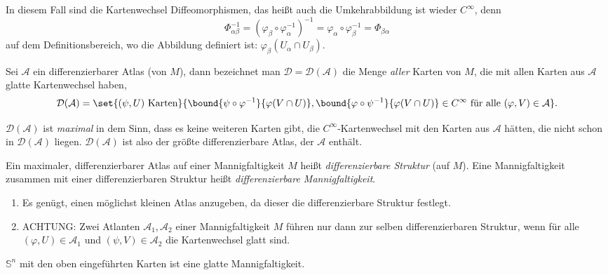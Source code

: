 \begin{rem*}
	In diesem Fall sind die Kartenwechsel Diffeomorphismen, das heißt auch die Umkehrabbildung ist wieder $C^\infty$, denn
	\[ \Phi_{\alpha\beta}^{-1} = \left(\varphi_\beta \circ \varphi_\alpha^{-1}\right)^{-1} = \varphi_\alpha \circ \varphi_\beta^{-1} = \Phi_{\beta\alpha} \]
	auf dem Definitionsbereich, wo die Abbildung definiert ist: $ \varphi_\beta(U_\alpha \cap U_\beta). $
\end{rem*}

\begin{defn}
	Sei $\mathcal{A}$ ein differenzierbarer Atlas (von $M$), dann bezeichnet man $\mathcal{D} = \mathcal{D}(\mathcal{A})$ die Menge \emph{aller} Karten von $M$, die mit allen Karten aus $\mathcal{A}$ glatte Kartenwechsel haben,
	\[ \mathcal{D}(\mathcal{A}) = \set{(\psi,U) \ \text{Karten}}{\bound{\psi \circ \varphi^{-1}}{\varphi(V \cap U)}, \bound{\varphi \circ \psi^{-1}}{\varphi(V \cap U)} \in C^\infty \ \text{für alle } (\varphi,V) \in \mathcal{A}}. \]
	\begin{rem*}
		$\mathcal{D}(\mathcal{A})$ ist \emph{maximal} in dem Sinn, dass es keine weiteren Karten gibt, die $C^\infty$-Kartenwechsel mit den Karten aus $\mathcal{A}$ hätten, die nicht schon in $\mathcal{D}(\mathcal{A})$ liegen. $\mathcal{D}(\mathcal{A})$ ist also der größte differenzierbare Atlas, der $\mathcal{A}$ enthält.
	\end{rem*}
	\begin{notat*}
		Ein maximaler, differenzierbarer Atlas auf einer Mannigfaltigkeit $M$ heißt \emph{differenzierbare Struktur} (auf $M$). Eine Mannigfaltigkeit zusammen mit einer differenzierbaren Struktur heißt \emph{differenzierbare Mannigfaltigkeit}.
	\end{notat*}
\end{defn}

\begin{rem*}
	\begin{enumerate}[label = {\roman*})]
		\item Es genügt, einen möglichst kleinen Atlas anzugeben, da dieser die differenzierbare Struktur festlegt.
		\item ACHTUNG: Zwei Atlanten $ \mathcal{A}_1,\mathcal{A}_2 $ einer Mannigfaltigkeit $M$ führen nur dann zur selben differenzierbaren Struktur, wenn für alle $ (\varphi,U) \in \mathcal{A}_1 $ und $ (\psi,V) \in \mathcal{A}_2 $ die Kartenwechsel glatt sind.
	\end{enumerate}
\end{rem*}

\begin{exmp*}
	$ \mathbb{S}^n $ mit den oben eingeführten Karten ist eine glatte Mannigfaltigkeit.
\end{exmp*}
	
